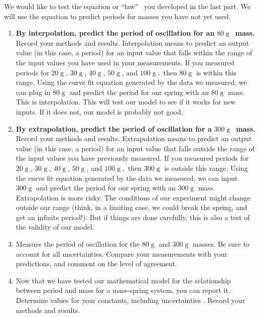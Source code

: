 \documentclass[twoside,11pt,ShortChapTitles]{BYUTextbook}
\begin{document}
We would like to test the equation or \textquotedblleft law\textquotedblright
\ you developed in the last part. We will use the equation to predict periods
for masses you have not yet used.

\begin{enumerate}
\item \textbf{By interpolation, predict the period of oscillation for an }$80
\operatorname{g}
$\textbf{\ mass.} Record your methods and results. Interpolation means to
predict an output value (in this case, a period) for an input value that falls
within the range of the input values you have used in your measurements. If
you measured periods for $20
\operatorname{g}
$, $30
\operatorname{g}
$, $40
\operatorname{g}
$, $50
\operatorname{g}
$, and $100
\operatorname{g}
,$ then $80
\operatorname{g}
$ is within this range. Using the curve fit equation generated by the data we
measured, we can plug in $80
\operatorname{g}
$ and predict the period for our spring with an $80
\operatorname{g}
$ mass. This is interpolation. This will test our model to see if it works for
new inputs. If it does not, our model is probably not good.

\item \textbf{By extrapolation, predict the period of oscillation for a }$300
\operatorname{g}
$\textbf{\ mass.} Record your methods and results. Extrapolation means to
predict an output value (in this case, a period) for an input value that falls
outside the range of the input values you have previously measured. If you
measured periods for $20
\operatorname{g}
$, $30
\operatorname{g}
$, $40
\operatorname{g}
$, $50
\operatorname{g}
$, and $100
\operatorname{g}
,$ then $300
\operatorname{g}
$ is outside this range. Using the curve fit equation generated by the data we
measured, we can input $300
\operatorname{g}
$ and predict the period for our spring with an $300
\operatorname{g}
$ mass. Extrapolation is more risky. The conditions of our experiment might
change outside our range (think, in a limiting case, we could break the
spring, and get an infinite period!). But if things are done carefully, this
is also a test of the validity of our model.

\item Measure the period of oscillation for the $80
\operatorname{g}
$ and $300
\operatorname{g}
$ masses. Be sure to account for all uncertainties. Compare your measurements
with your predictions, and comment on the level of agreement.

\item Now that we have tested our mathematical model for the relationship
between period and mass for a mass-spring system, you can report it. Determine
values for your constants, including uncertainties . Record your methods and results.
\end{enumerate}
\end{document}
